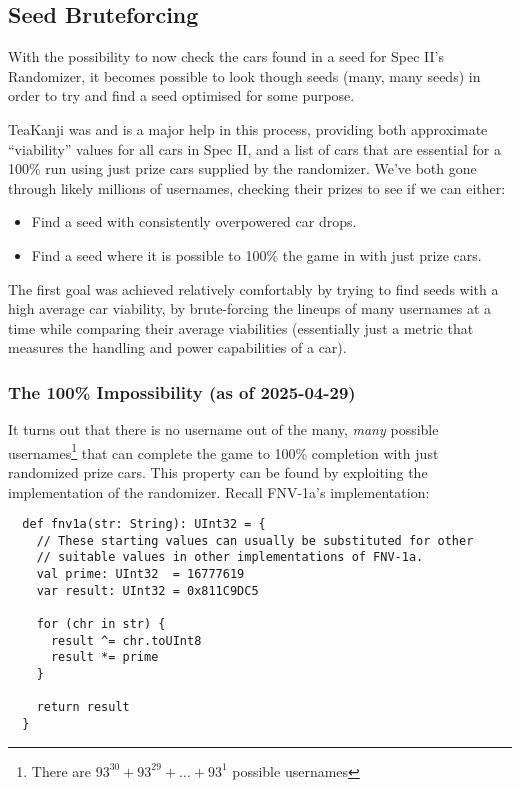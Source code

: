 \documentclass[14pt,a4paper,notitlepage]{extarticle}
\begin{document}
        \subsection*{Seed Bruteforcing}
            With the possibility to now check the cars found in a seed for Spec II's
            Randomizer, it becomes possible to look though seeds (many, many seeds) in order
            to try and find a seed optimised for some purpose.

            TeaKanji was and is a major help in this process, providing both approximate
            ``viability'' values for all cars in Spec II, and a list of cars that are essential
            for a 100\% run using just prize cars supplied by the randomizer. We've both gone
            through likely millions of usernames, checking their prizes to see if we can either:

            \begin{itemize}
                \item Find a seed with consistently overpowered car drops.
                \item Find a seed where it is possible to 100\% the game in with just prize cars.
            \end{itemize}

            The first goal was achieved relatively comfortably by trying to find seeds with
            a high average car viability, by brute-forcing the lineups of many usernames at
            a time while comparing their average viabilities (essentially just a metric
            that measures the handling and power capabilities of a car).

            \subsubsection*{The 100\% Impossibility (as of 2025-04-29)}
                It turns out that there is no username out of the many, \textit{many} possible
                usernames\footnote{There are $93^{30} + 93^{29} + \dots + 93^1$ possible usernames}
                that can complete the game to 100\% completion with just randomized prize
                cars. This property can be found by exploiting the implementation of the randomizer.
                Recall FNV-1a's implementation:

                \begin{lstlisting}
  def fnv1a(str: String): UInt32 = {
    // These starting values can usually be substituted for other
    // suitable values in other implementations of FNV-1a.
    val prime: UInt32  = 16777619
    var result: UInt32 = 0x811C9DC5

    for (chr in str) {
      result ^= chr.toUInt8
      result *= prime
    }

    return result
  }
                \end{lstlisting}
\end{document}
